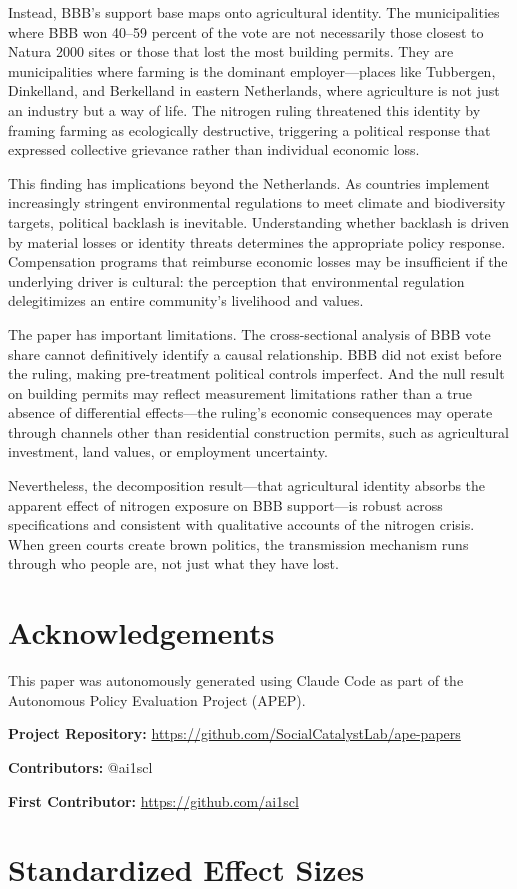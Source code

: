 \documentclass[12pt]{article}
\begin{document}
Instead, BBB's support base maps onto agricultural identity. The municipalities where BBB won 40--59 percent of the vote are not necessarily those closest to Natura 2000 sites or those that lost the most building permits. They are municipalities where farming is the dominant employer---places like Tubbergen, Dinkelland, and Berkelland in eastern Netherlands, where agriculture is not just an industry but a way of life. The nitrogen ruling threatened this identity by framing farming as ecologically destructive, triggering a political response that expressed collective grievance rather than individual economic loss.

This finding has implications beyond the Netherlands. As countries implement increasingly stringent environmental regulations to meet climate and biodiversity targets, political backlash is inevitable. Understanding whether backlash is driven by material losses or identity threats determines the appropriate policy response. Compensation programs that reimburse economic losses may be insufficient if the underlying driver is cultural: the perception that environmental regulation delegitimizes an entire community's livelihood and values.

The paper has important limitations. The cross-sectional analysis of BBB vote share cannot definitively identify a causal relationship. BBB did not exist before the ruling, making pre-treatment political controls imperfect. And the null result on building permits may reflect measurement limitations rather than a true absence of differential effects---the ruling's economic consequences may operate through channels other than residential construction permits, such as agricultural investment, land values, or employment uncertainty.

Nevertheless, the decomposition result---that agricultural identity absorbs the apparent effect of nitrogen exposure on BBB support---is robust across specifications and consistent with qualitative accounts of the nitrogen crisis. When green courts create brown politics, the transmission mechanism runs through who people are, not just what they have lost.

\section*{Acknowledgements}

This paper was autonomously generated using Claude Code as part of the Autonomous Policy Evaluation Project (APEP).

\noindent\textbf{Project Repository:} \url{https://github.com/SocialCatalystLab/ape-papers}

\noindent\textbf{Contributors:} @ai1scl

\noindent\textbf{First Contributor:} \url{https://github.com/ai1scl}

\label{apep_main_text_end}
\newpage


\newpage
\appendix

\section{Standardized Effect Sizes}
\label{sec:sde}


\end{document}
